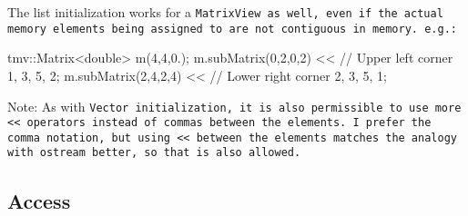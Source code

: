 The list initialization works for a \tt{MatrixView} as well, even if the actual memory elements
being assigned to are not contiguous in memory.  e.g.:
\begin{tmvcode}
tmv::Matrix<double> m(4,4,0.);
m.subMatrix(0,2,0,2) << // Upper left corner
    1,  3, 
    5,  2;
m.subMatrix(2,4,2,4) << // Lower right corner
    2,  3, 
    5,  1;
\end{tmvcode}
Note: As with \tt{Vector} initialization, it is also permissible to use more \tt{<<} operators instead of commas between the elements.  I prefer the comma notation, but using \tt{<<} between the elements matches the analogy with \tt{ostream} better, so that is also allowed.

\subsection{Access}
\label{Matrix_Access}

